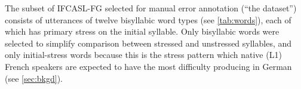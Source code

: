\documentclass[a4paper]{article}
\begin{document}
	The subset of IFCASL-FG selected for manual error annotation (``the dataset'') consists of utterances of twelve bisyllabic word types (see \cref{tab:words}), each of which has primary stress on the initial syllable. 
	Only bisyllabic words were selected to simplify comparison between stressed and unstressed syllables, and only initial-stress words because this is the stress pattern which native (L1) French speakers are expected to have the most difficulty 
	producing in German
	 (see \cref{sec:bkgd}).
	
\end{document}
